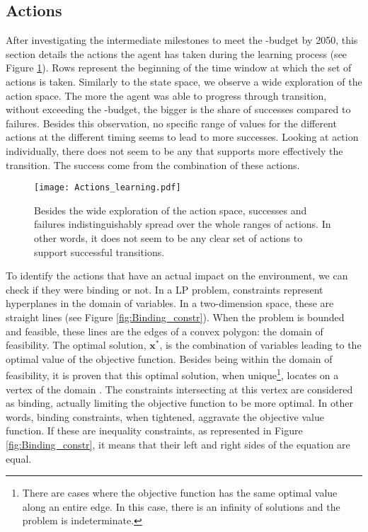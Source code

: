 \subsection{Actions}
\label{subsec:RL:learning:actions}

After investigating the intermediate milestones to meet the -budget by 2050, this section details the actions the agent has taken during the learning process (see Figure \ref{fig:Actions_learning}). Rows represent the beginning of the time window at which the set of actions is taken. Similarly to the state space, we observe a wide exploration of the action space. The more the agent was able to progress through transition, without exceeding the -budget, the bigger is the share of successes compared to failures. Besides this observation, no specific range of values for the different actions at the different timing seems to lead to more successes. Looking at action individually, there does not seem to be any that supports more effectively the transition. The success come from the combination of these actions.

\begin{figure}[!htbp]
\centering
\texttt{[image: Actions\_learning.pdf]}
\caption{Besides the wide exploration of the action space, successes and failures indistinguishably spread over the whole ranges of actions. In other words, it does not seem to be any clear set of actions to support successful transitions.}
\label{fig:Actions_learning}
\end{figure}

To identify the actions that have an actual impact on the environment, we can check if they were binding or not. In a \gls{LP} problem, constraints represent hyperplanes in the domain of variables. In a two-dimension space, these are straight lines (see Figure \ref{fig:Binding_constr}). When the problem is bounded and feasible, these lines are the edges of a convex polygon: the domain of feasibility. The optimal solution, $\textbf{x}^*$, is the combination of variables leading to the optimal value of the objective function. Besides being within the domain of feasibility, it is proven that this optimal solution, when unique\footnote{There are cases where the objective function has the same optimal value along an entire edge. In this case, there is an infinity of solutions and the problem is indeterminate.}, locates on a vertex of the domain \cite{bertsimas1997introduction}. The constraints intersecting at this vertex are considered as binding, actually limiting the objective function to be more optimal. In other words, binding constraints, when tightened, aggravate the objective value function. If these are inequality constraints, as represented in Figure \ref{fig:Binding_constr}, it means that their left and right sides of the equation are equal.

